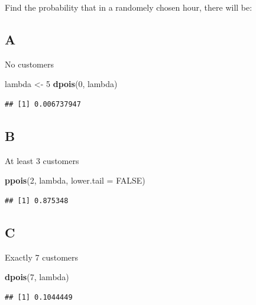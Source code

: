 \documentclass[
]{article}
\newenvironment{Shaded}{\begin{snugshade}}{\end{snugshade}}
\newcommand{\DataTypeTok}[1]{\textcolor[rgb]{0.13,0.29,0.53}{#1}}
\newcommand{\DecValTok}[1]{\textcolor[rgb]{0.00,0.00,0.81}{#1}}
\newcommand{\KeywordTok}[1]{\textcolor[rgb]{0.13,0.29,0.53}{\textbf{#1}}}
\newcommand{\NormalTok}[1]{#1}
\newcommand{\OtherTok}[1]{\textcolor[rgb]{0.56,0.35,0.01}{#1}}
\newcommand{\StringTok}[1]{\textcolor[rgb]{0.31,0.60,0.02}{#1}}
\begin{document}
Find the probability that in a randomely chosen hour, there will be:

\hypertarget{a-3}{%
\subsection{A}\label{a-3}}

No customers

\begin{Shaded}
\begin{Highlighting}[]
\NormalTok{lambda \textless{}{-}}\StringTok{ }\DecValTok{5}
\KeywordTok{dpois}\NormalTok{(}\DecValTok{0}\NormalTok{, lambda)}
\end{Highlighting}
\end{Shaded}

\begin{verbatim}
## [1] 0.006737947
\end{verbatim}

\hypertarget{b-3}{%
\subsection{B}\label{b-3}}

At least 3 customers

\begin{Shaded}
\begin{Highlighting}[]
\KeywordTok{ppois}\NormalTok{(}\DecValTok{2}\NormalTok{, lambda, }\DataTypeTok{lower.tail =} \OtherTok{FALSE}\NormalTok{)}
\end{Highlighting}
\end{Shaded}

\begin{verbatim}
## [1] 0.875348
\end{verbatim}

\hypertarget{c-1}{%
\subsection{C}\label{c-1}}

Exactly 7 customers

\begin{Shaded}
\begin{Highlighting}[]
\KeywordTok{dpois}\NormalTok{(}\DecValTok{7}\NormalTok{, lambda)}
\end{Highlighting}
\end{Shaded}

\begin{verbatim}
## [1] 0.1044449
\end{verbatim}
\end{document}
